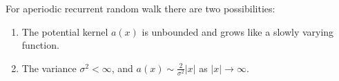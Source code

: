 For aperiodic recurrent random walk there are two possibilities:
\begin{enumerate}
\item[Type I:] The potential kernel \(a(x)\) is unbounded and grows like a slowly varying function.
\item[Type II:] The variance \(\sigma^2 < \infty\), and \(a(x) \sim \frac{2}{\sigma^2} |x|\) as \(|x| \to \infty\).
\end{enumerate}
